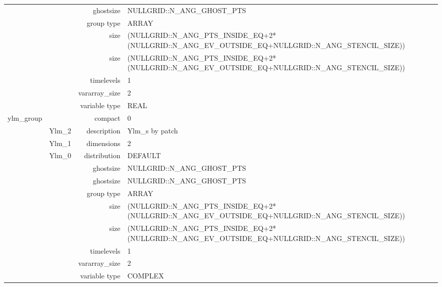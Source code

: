\begin{tabular*}{150mm}{|c|c@{\extracolsep{\fill}}|rl|}
& ~ & ghostsize & NULLGRID::N\_ANG\_GHOST\_PTS \\ 
 &  & group type & ARRAY \\ 
 &  & size & (NULLGRID::N\_ANG\_PTS\_INSIDE\_EQ+2*(NULLGRID::N\_ANG\_EV\_OUTSIDE\_EQ+NULLGRID::N\_ANG\_STENCIL\_SIZE)) \\ 
& ~ & size & (NULLGRID::N\_ANG\_PTS\_INSIDE\_EQ+2*(NULLGRID::N\_ANG\_EV\_OUTSIDE\_EQ+NULLGRID::N\_ANG\_STENCIL\_SIZE)) \\ 
 &  & timelevels & 1 \\ 
 &  & vararray\_size & 2 \\ 
 &  & variable type & REAL \\ 
\hline 
ylm\_group &  & compact & 0 \\ 
 & Ylm\_2 & description & Ylm\_s by patch \\ 
 & Ylm\_1 & dimensions & 2 \\ 
 & Ylm\_0 & distribution & DEFAULT \\ 
 &  & ghostsize & NULLGRID::N\_ANG\_GHOST\_PTS \\ 
& ~ & ghostsize & NULLGRID::N\_ANG\_GHOST\_PTS \\ 
 &  & group type & ARRAY \\ 
 &  & size & (NULLGRID::N\_ANG\_PTS\_INSIDE\_EQ+2*(NULLGRID::N\_ANG\_EV\_OUTSIDE\_EQ+NULLGRID::N\_ANG\_STENCIL\_SIZE)) \\ 
& ~ & size & (NULLGRID::N\_ANG\_PTS\_INSIDE\_EQ+2*(NULLGRID::N\_ANG\_EV\_OUTSIDE\_EQ+NULLGRID::N\_ANG\_STENCIL\_SIZE)) \\ 
 &  & timelevels & 1 \\ 
 &  & vararray\_size & 2 \\ 
 &  & variable type & COMPLEX \\ 
\hline 
\end{tabular*} 



\vspace{5mm}
\vspace{5mm}

